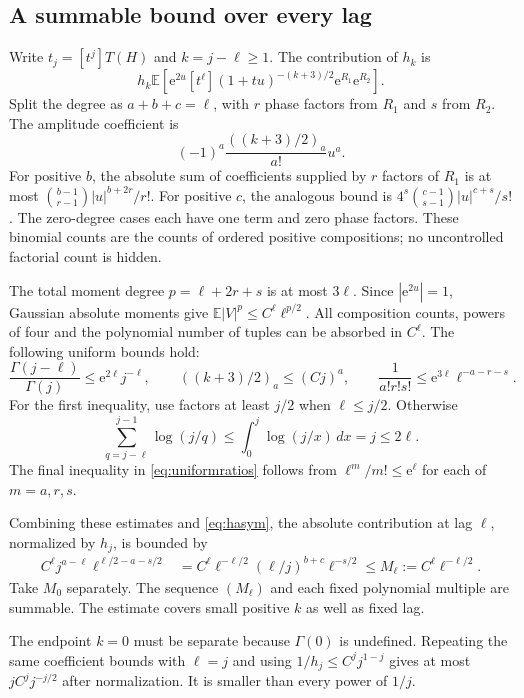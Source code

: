 \documentclass[11pt,letterpaper]{article}
\numberwithin{equation}{section}
\theoremstyle{remark}\newtheorem{remark}[theorem]{Remark}
\newcommand{\E}{\mathbb E}
\newcommand{\e}{\mathrm e}
\begin{document}
\subsection{A summable bound over every lag}
Write $t_j=[t^j]T(H)$ and $k=j-\ell\ge1$. The contribution of $h_k$ is
\begin{equation}\label{eq:lag}
 h_k\E\left[\e^{2u}[t^\ell](1+tu)^{-(k+3)/2}\e^{R_1}\e^{R_2}\right].
\end{equation}
Split the degree as $a+b+c=\ell$, with $r$ phase factors from $R_1$ and $s$ from $R_2$. The amplitude coefficient is
\[
 (-1)^a\frac{((k+3)/2)_a}{a!}u^a.
\]
For positive $b$, the absolute sum of coefficients supplied by $r$ factors of $R_1$ is at most
$\binom{b-1}{r-1}|u|^{b+2r}/r!$. For positive $c$, the analogous bound is
$4^s\binom{c-1}{s-1}|u|^{c+s}/s!$. The zero-degree cases each have one term and zero phase factors. These binomial counts are the counts of ordered positive compositions; no uncontrolled factorial count is hidden.

The total moment degree $p=\ell+2r+s$ is at most $3\ell$. Since $|\e^{2u}|=1$, Gaussian absolute moments give
$\E|V|^p\le C^\ell\ell^{p/2}$. All composition counts, powers of four and the polynomial number of tuples can be absorbed in $C^\ell$. The following uniform bounds hold:
\begin{equation}\label{eq:uniformratios}
 \frac{\Gamma(j-\ell)}{\Gamma(j)}\le\e^{2\ell}j^{-\ell},\qquad
 ((k+3)/2)_a\le(Cj)^a,\qquad
 \frac1{a!r!s!}\le\e^{3\ell}\ell^{-a-r-s}.
\end{equation}
For the first inequality, use factors at least $j/2$ when $\ell\le j/2$. Otherwise
\[
 \sum_{q=j-\ell}^{j-1}\log(j/q)
 \le\int_0^j\log(j/x)\,dx=j\le2\ell.
\]
The final inequality in \eqref{eq:uniformratios} follows from $\ell^m/m!\le\e^\ell$ for each of $m=a,r,s$.

Combining these estimates and \eqref{eq:hasym}, the absolute contribution at lag $\ell$, normalized by $h_j$, is bounded by
\begin{align}\label{eq:majorant}
 C^\ell j^{a-\ell}\ell^{\ell/2-a-s/2}
 &=C^\ell\ell^{-\ell/2}(\ell/j)^{b+c}\ell^{-s/2}
 \le M_\ell:=C^\ell\ell^{-\ell/2}.
\end{align}
Take $M_0$ separately. The sequence $(M_\ell)$ and each fixed polynomial multiple are summable. The estimate covers small positive $k$ as well as fixed lag.

The endpoint $k=0$ must be separate because $\Gamma(0)$ is undefined. Repeating the same coefficient bounds with $\ell=j$ and using
$1/h_j\le C^j j^{1-j}$ gives at most $jC^j j^{-j/2}$ after normalization. It is smaller than every power of $1/j$.
\end{document}
